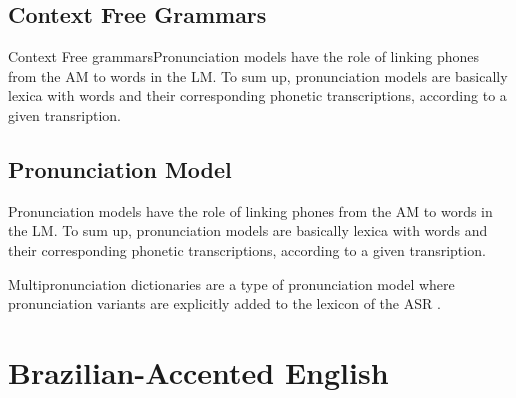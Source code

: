 \documentclass[twocolumn]{bmcart}%
\begin{document}
\subsection*{\textbf{Context Free Grammars}}

Context Free grammarsPronunciation models have the role of linking phones from the AM to words in the LM. To sum up, pronunciation models are basically lexica with words and their corresponding phonetic transcriptions, according to a given transription.

\subsection*{\textbf{Pronunciation Model}}

Pronunciation models have the role of linking phones from the AM to words in the LM. To sum up, pronunciation models are basically lexica with words and their corresponding phonetic transcriptions, according to a given transription.

Multipronunciation dictionaries are a type of pronunciation model where pronunciation variants are explicitly added to the lexicon of the ASR \cite{Strik2001}.

\section*{Brazilian-Accented English}
\end{document}

